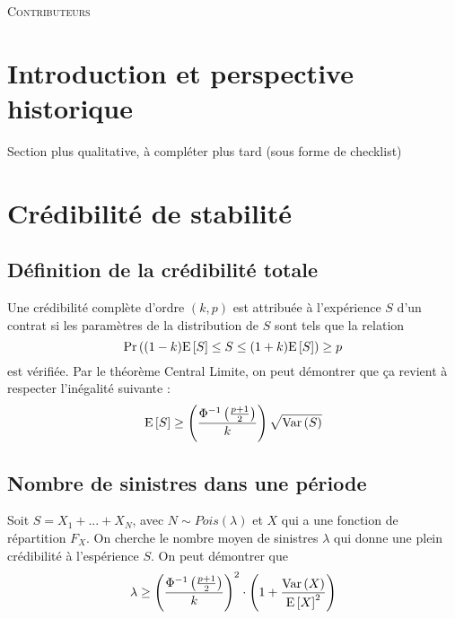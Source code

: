 \documentclass[10pt, french]{article}
\begin{document}
\begin{center}
	\textsc{\Large Contributeurs}\\[0.5cm] 
\end{center}


\newpage
\begin{multicols*}{3} %
\section{Introduction et perspective historique}
Section plus qualitative, à compléter plus tard (sous forme de checklist)




\section{Crédibilité de stabilité}
\subsection*{Définition de la crédibilité totale}
\begin{definition}
Une crédibilité complète d'ordre $(k,p)$ est attribuée à l'expérience $S$ d'un contrat si les paramètres de la distribution de $S$ sont tels que la relation
\[\Pr \left( (1-k)\mathrm{E} \left[ S \right] \leq S \leq (1+k) \mathrm{E} \left[ S \right] \right) \geq p \]
est vérifiée. Par le théorème Central Limite, on peut démontrer que ça revient à respecter l'inégalité suivante : 
\begin{equation}
\mathrm{E} \left[ S \right] \geq \left( \frac{\Phi^{-1}\left(\frac{p+1}{2} \right)}{k} \right) \sqrt{\mathrm{Var} \left( S \right)}
\end{equation}
\end{definition}

\subsection*{Nombre de sinistres dans une période}
Soit $S = X_1 + ... + X_N$, avec $N \sim Pois(\lambda)$ et $X$ qui a une fonction de répartition $F_X$. On cherche le nombre moyen de sinistres $\lambda$ qui donne une plein crédibilité à l'espérience $S$. On peut démontrer que
\begin{equation}
\lambda \geq \left( \frac{\Phi^{-1}\left(\frac{p+1}{2} \right)}{k} \right)^2 \cdot \left(1 + \frac{\mathrm{Var} \left( X \right)}{\mathrm{E} \left[ X \right]^2} \right)
\end{equation}

\end{multicols*}
\end{document}
